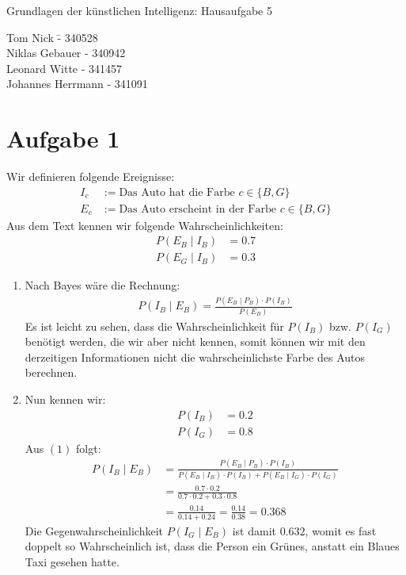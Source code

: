 \documentclass[a4paper,10pt]{article}
\begin{document}
\begin{center}
\Large{Grundlagen der künstlichen Intelligenz: Hausaufgabe 5} \\
\end{center}
\begin{tabbing}
Tom Nick \hspace{2cm}\= - 340528\\
Niklas Gebauer \> - 340942 \\
Leonard Witte \> - 341457 \\
Johannes Herrmann \> - 341091\\
\end{tabbing}

\section*{Aufgabe 1}
    Wir definieren folgende Ereignisse:
    \begin{align*}
        I_c &:= \text{Das Auto hat die Farbe $c \in \{B,G\}$} \\
        E_c &:= \text{Das Auto erscheint in der Farbe $c \in \{B, G\}$}
    \end{align*}
    Aus dem Text kennen wir folgende Wahrscheinlichkeiten:
    \begin{align*}
        P(E_B \mid I_B) &= 0.7 \\
        P(E_G \mid I_B) &= 0.3
    \end{align*}
    \begin{enumerate}[~~a.)]
        \item Nach Bayes wäre die Rechnung:
        \begin{align}
            P(I_B \mid E_B) = \frac{P(E_B\mid P_B) \cdot P(I_B)}{P(E_B)}
        \end{align}
        Es ist leicht zu sehen, dass die Wahrscheinlichkeit für $P(I_B)$ bzw. $P(I_G)$ benötigt werden, die wir aber nicht kennen, somit können wir mit den derzeitigen Informationen nicht die wahrscheinlichste Farbe des Autos berechnen.
        \item Nun kennen wir:
        \begin{align*}
            P(I_B) &= 0.2 \\
            P(I_G) &= 0.8
        \end{align*}
        Aus $(1)$ folgt:
        \begin{align*}
            P(I_B \mid E_B) &= \frac{P(E_B\mid P_B) \cdot P(I_B)}{P(E_B \mid I_B) \cdot P(I_B) + P(E_B \mid I_G) \cdot P(I_G)} \\
            &= \frac{0.7 \cdot 0.2}{0.7 \cdot 0.2 + 0.3 \cdot 0.8} \\
            &= \frac{0.14}{0.14 + 0.24} = \frac{0.14}{0.38} = 0.368
        \end{align*}
        Die Gegenwahrscheinlichkeit $P(I_G \mid E_B)$ ist damit $0.632$, womit es fast doppelt so Wahrscheinlich ist, dass die Person ein Grünes, anstatt ein Blaues Taxi gesehen hatte.
    \end{enumerate}
\end{document}

